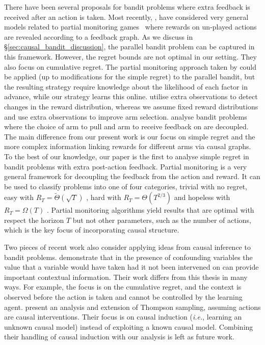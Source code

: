 \documentclass[11pt,a4paper,twoside]{report}
\newcommand{\ie}{\textit{i.e.}}
\newcommand{\bigtheta}[1]{\Theta\left( #1 \right)}
\newcommand{\bigthetatilde}[1]{\tilde{\Theta}\left( #1 \right)}
\newcommand{\bigomega}[1]{\Omega\left( #1 \right)}
\theoremstyle{plain}
\theoremstyle{definition}
\begin{document}
There have been several proposals for bandit problems where extra feedback is received after an action is taken.
Most recently, \citet{Alon2015}, \citet{Kocak2014} have considered very general models related to partial monitoring games~\citep{Bartok2014} where rewards on un-played actions are revealed according to a feedback graph. As we discuss in \S\ref{sec:causal_bandit_discussion}, the parallel bandit problem can be captured in this framework. However, the regret bounds are not optimal in our setting. They also focus on cumulative regret. The partial monitoring approach taken by \citet{wu2015online} could be applied (up to modifications for the simple regret) to the parallel bandit, but the resulting strategy require knowledge about the likelihood of each factor in advance, while our strategy learns this online. \citet{Yu2009} utilise extra observations to detect changes in the reward distribution, whereas we assume fixed reward distributions and use extra observations to improve arm selection. \citet{Avner2012} analyse bandit problems where the choice of arm to pull and arm to receive feedback on are decoupled. The main difference from our present work is our focus on simple regret and the more complex information linking rewards for different arms via causal graphs. To the best of our knowledge, our paper is the first to analyse simple regret in bandit problems with extra post-action feedback. Partial monitoring is a very general framework for decoupling the feedback from the action and reward. It can be used to classify problems into one of four categories, trivial with no regret, easy with $R_T = \bigthetatilde{\sqrt{T}}$ , hard with $R_T = \bigtheta{T^{2/3}}$ and hopeless with $R_T = \bigomega{T}$ \citep{Bartok2014}. Partial monitoring algorithms yield results that are optimal with respect the horizon $T$ but not other parameters, such as the number of actions, which is the key focus of incorporating causal structure. 




Two pieces of recent work also consider applying ideas from causal inference to bandit problems. \citet{Bareinboim2015} demonstrate that in the presence of confounding variables the value that a variable would have taken had it not been 
intervened on can provide important contextual information. Their work differs from this thesis in many ways. For example, the focus is on the cumulative regret, and the context is observed before the action is taken and cannot be controlled by the learning agent. \citet{Ortega2014thompson} present an analysis and extension of Thompson sampling, assuming actions are causal interventions. Their focus is on causal induction (\ie, learning an unknown causal model) instead of exploiting a known causal model. Combining their handling of  causal induction with our analysis is left as future work.
\end{document}
